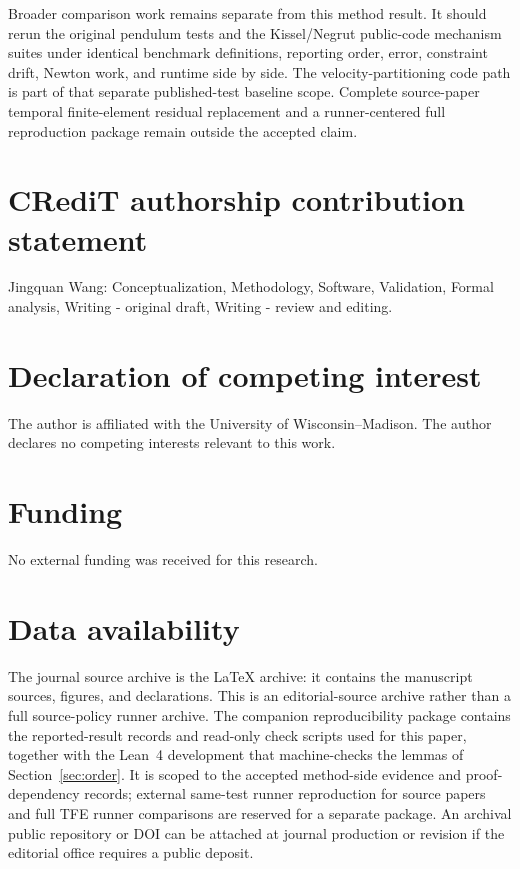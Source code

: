 \documentclass[preprint,12pt]{elsarticle}
\newcommand{\tfe}{TFE}
\begin{document}
Broader comparison work remains separate from this method result. It should
rerun the original pendulum tests and the Kissel/Negrut public-code mechanism
suites under identical benchmark definitions, reporting order, error,
constraint drift, Newton work, and runtime side by side. The
velocity-partitioning code path is part of that separate published-test baseline
scope. Complete source-paper temporal finite-element residual replacement and
a runner-centered full reproduction package remain outside the accepted claim.

\section*{CRediT authorship contribution statement}

Jingquan Wang: Conceptualization, Methodology, Software, Validation, Formal
analysis, Writing - original draft, Writing - review and editing.

\section*{Declaration of competing interest}

The author is affiliated with the University of Wisconsin--Madison. The author
declares no competing interests relevant to this work.

\section*{Funding}

No external funding was received for this research.

\section*{Data availability}

The journal source archive is the LaTeX archive: it contains the manuscript
sources, figures, and declarations. This is an editorial-source archive rather
than a full source-policy runner archive.
The companion reproducibility package contains the reported-result records and
read-only check scripts used for this paper, together with the Lean~4
development that machine-checks the lemmas of Section~\ref{sec:order}. It is scoped to the accepted
method-side evidence and proof-dependency records; external same-test runner
reproduction for source papers and full \tfe{} runner comparisons are reserved
for a separate package. An archival public repository or DOI can be attached
at journal production or revision if the editorial office requires a public
deposit.
\end{document}
